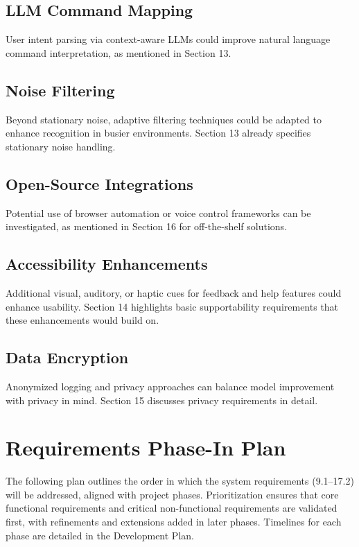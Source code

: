 \documentclass[11pt]{article}
\begin{document}
\subsection{LLM Command Mapping}
User intent parsing via context-aware LLMs could improve natural language command interpretation, as mentioned in Section 13.

\subsection{Noise Filtering}
Beyond stationary noise, adaptive filtering techniques could be adapted to enhance recognition in busier environments. Section 13 already specifies stationary noise handling.

\subsection{Open-Source Integrations}
Potential use of browser automation or voice control frameworks can be investigated, as mentioned in Section 16 for off-the-shelf solutions.

\subsection{Accessibility Enhancements}
Additional visual, auditory, or haptic cues for feedback and help features could enhance usability. Section 14 highlights basic supportability requirements that these enhancements would build on.

\subsection{Data Encryption}
Anonymized logging and privacy approaches can balance model improvement with privacy in mind. Section 15 discusses privacy requirements in detail.

\section{Requirements Phase-In Plan}

The following plan outlines the order in which the system requirements (9.1--17.2) will be addressed, aligned with project phases. Prioritization ensures that core functional requirements and critical non-functional requirements are validated first, with refinements and extensions added in later phases. Timelines for each phase are detailed in the Development Plan.
\end{document}
